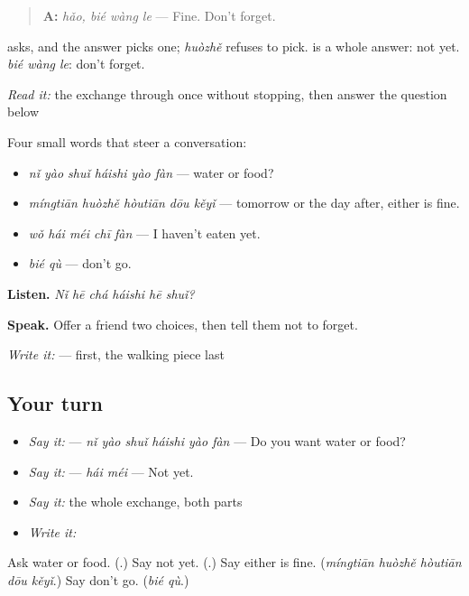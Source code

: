 \begin{quote}
\textbf{A:} \emph{hǎo, bié wàng le} — Fine. Don't forget.
\end{quote}

 asks, and the answer picks one; \emph{huòzhě} refuses to pick.  is a whole answer: not yet. \emph{bié wàng le}: don't forget.

\begin{tcolorbox}[breakable,skin=enhanced,colback=orange!6,colframe=orange!45!black,boxrule=0.5pt,arc=1mm,left=6pt,right=6pt,top=4pt,bottom=4pt,fonttitle=\bfseries,title={Read this}]
\emph{Read it:} the exchange through once without stopping, then answer the question below
\end{tcolorbox}

\begin{grammarlens}[title={What you've built — or, still, not yet, don't}]
Four small words that steer a conversation:

\begin{itemize}
\raggedright
  \item \textbf{} \emph{nǐ yào shuǐ háishi yào fàn} — water or food?
  \item \emph{míngtiān huòzhě hòutiān dōu kěyǐ} — tomorrow or the day after, either is fine.
  \item \textbf{} \emph{wǒ hái méi chī fàn} — I haven't eaten yet.
  \item \emph{bié qù} — don't go.
\end{itemize}

\textbf{Listen.} \emph{Nǐ hē chá háishi hē shuǐ?}

\textbf{Speak.} Offer a friend two choices, then tell them not to forget.

\emph{Write it:}  —  first, the walking piece last
\end{grammarlens}

\subsection*{Your turn}
\begin{itemize}
\raggedright
  \item \emph{Say it:}  — \emph{nǐ yào shuǐ háishi yào fàn} — Do you want water or food?
  \item \emph{Say it:}  — \emph{hái méi} — Not yet.
  \item \emph{Say it:} the whole exchange, both parts
  \item \emph{Write it:} 
\end{itemize}

\begin{tcolorbox}[breakable,colback=teal!4,colframe=teal!35!black,title={Before you move on}]
Ask water or food. (\textbf{}.) Say not yet. (\textbf{}.) Say either is fine. (\emph{míngtiān huòzhě hòutiān dōu kěyǐ}.) Say don't go. (\emph{bié qù}.)
\end{tcolorbox}

